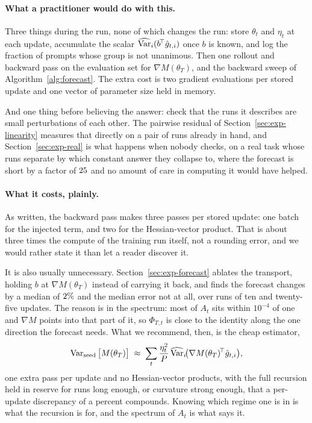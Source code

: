 \paragraph{What a practitioner would do with this.} Three things during the run, none of which
changes the run: store $\theta_t$ and $\eta_t$ at each update, accumulate the scalar
$\widehat{\operatorname{Var}}_i(b^{\!\top}\hat{g}_{t,i})$ once $b$ is known, and log the fraction of prompts whose
group is not unanimous. Then one rollout and backward pass on the evaluation set for
$\nabla M(\theta_T)$, and the backward sweep of Algorithm~\ref{alg:forecast}. The extra cost is two
gradient evaluations per stored update and one vector of parameter size held in memory.

And one thing before believing the answer: check that the runs it describes are small perturbations
of each other. The pairwise residual of Section~\ref{sec:exp-linearity} measures that directly on
a pair of runs already in hand, and
Section~\ref{sec:exp-real} is what happens when nobody checks, on a real task whose runs separate
by which constant answer they collapse to, where the forecast is short by a factor of $25$ and no amount of care in
computing it would have helped.

\paragraph{What it costs, plainly.} As written, the backward pass makes three passes per stored
update: one batch for the injected term, and two for the Hessian-vector product. That is about
three times the compute of the training run itself, not a rounding error, and we would rather state
it than let a reader discover it.

It is also usually unnecessary. Section~\ref{sec:exp-forecast} ablates the transport, holding
$b$ at $\nabla M(\theta_T)$ instead of carrying it back, and finds the forecast changes by a
median of $2\%$ and the median error not at all, over runs of ten and twenty-five updates. The
reason is in the spectrum: most of $A_t$ sits within $10^{-4}$ of one and $\nabla M$ points into
that part of it, so $\Phi_{T,t}$ is close to the identity along the one direction the forecast
needs. What we recommend, then, is the cheap estimator,
\begin{equation}
  \label{eq:cheap}
  \operatorname{Var}_{\text{seed}}\big[M(\theta_T)\big] \;\approx\;
  \sum_{t} \frac{\eta_t^2}{P}\,\widehat{\operatorname{Var}}_i\!\big(\nabla M(\theta_T)^{\!\top}\hat{g}_{t,i}\big),
\end{equation}
one extra pass per update and no Hessian-vector products, with the full recursion held in
reserve for runs long enough, or curvature strong enough, that a per-update discrepancy of a percent
compounds. Knowing which regime one is in is what the recursion is for, and the spectrum of $A_t$ is
what says it.

